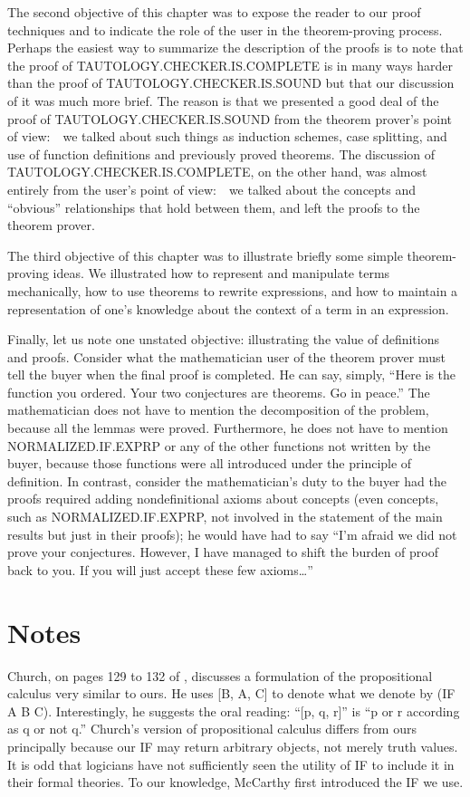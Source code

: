 \documentclass[11pt]{book}
\newcommand{\pubdefaulttextsize}{\large}
\begin{document}
The second objective of this chapter was to expose the
reader to our proof techniques and to indicate the role of the user in the
theorem-proving process.  Perhaps the easiest way to summarize
the description of the proofs is to note that
the proof of TAU\-TOL\-OGY.CHECK\-ER.IS.COMPLETE
is in many ways harder than the proof of TAU\-TOL\-OGY.CHECK\-ER.IS.SOUND
but that our discussion of it was much more brief.  The reason is that we
presented a good deal of the proof of TAU\-TOL\-OGY.CHECK\-ER.IS.SOUND
from the theorem prover's
point of view:~~we talked about such things as induction schemes,
case splitting, and use of function definitions and previously proved theorems.
The discussion of TAU\-TOL\-OGY.CHECK\-ER.IS.COMPLETE, on the other hand, was almost
entirely from the user's point of view:~~we talked about the concepts
and ``obvious'' relationships that hold between them, and left the proofs to
the theorem prover.

The third objective of this chapter was to
illustrate briefly some simple theorem-proving ideas.  We illustrated how to
represent  and manipulate terms mechanically, how to use theorems to rewrite
expressions, and how to  maintain a representation of one's knowledge about
the context of a term in an expression.

Finally, let us note one unstated objective: illustrating the value of definitions
and proofs.  Consider what the mathematician user of the theorem
prover must tell the buyer when the final proof is completed.
He can say, simply, ``Here is the function you ordered.
Your two conjectures are theorems.  Go in peace.''  The mathematician
does not have to mention the decomposition of the problem, because all
the lemmas were proved.  Furthermore, he does not have to mention
NOR\-MAL\-IZED.IF.EXPRP or any of the other functions not written
by the buyer, because those functions were all
introduced under the principle of definition.  In contrast, consider
the mathematician's duty to the buyer had the proofs required adding
nondefinitional axioms about concepts (even concepts, such as NOR\-MAL\-IZED.IF.EXPRP,
not involved in the statement of the main results but just in their proofs);
he would have had to say ``I'm afraid we did not
prove your conjectures.  However, I have managed to shift the burden of proof
back to you.  If you will just accept these few axioms\ldots{}''
\section{Notes}
\pubdefaulttextsize
Church, on pages 129 to 132 of
\cite{CHURCH}, discusses a formulation of the propositional
calculus very similar to ours.  He uses [B, A, C] to
denote what we denote by (IF A B C).  Interestingly, he
suggests the oral reading: ``[p, q, r]'' is ``p or r according as
q or not q.''  Church's version of propositional calculus differs
from ours principally because our IF may return arbitrary
objects, not merely truth values.  It is odd that logicians
have not sufficiently seen the utility of IF to include
it in their formal theories.  To our knowledge, McCarthy \cite{MCCARTHYBASIS}
first introduced the IF we use.
\end{document}
